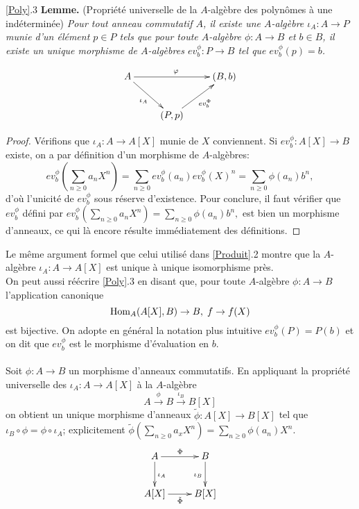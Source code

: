  \ref{Poly}.3 \textbf{Lemme.} (Propriété universelle de la $A$-algèbre des polynômes à une indéterminée) \textit{Pour tout anneau commutatif $A$, il existe une $A$-algèbre $\iota_A: A\rightarrow P$ munie d'un élément $p\in P$ tels que pour toute $A$-algèbre $\phi: A\rightarrow B$ et  $b\in B$, il existe un unique  morphisme de $A$-algèbres $ev^\phi_b:P\rightarrow B$  tel que $ ev^\phi_b(p)=b$. }

	$$ \xymatrix{A \ar[rd]_{\iota_A} \ar[rr]^\varphi && (B, b) \\ & (P, p) \ar[ru]_{ev_b^\Phi}} $$

\begin{proof} Vérifions que $\iota_A:A\rightarrow A[X]$ munie de $X$ conviennent. Si $ev_b^\phi:A[X]\rightarrow B$ existe,  on a par définition d'un morphisme de $A$-algèbres:
$$ev^\phi_b(\sum_{n\geq 0}a_nX^n)=\sum_{n\geq 0}ev_b^\phi(a_n)ev_b^\phi(X)^n=\sum_{n\geq 0}\phi(a_n)b^n,$$
d'où l'unicité de $ev_b^\phi$ sous réserve d'existence.  Pour conclure, il faut vérifier que $ev_b^\phi$ défini par  $ev^\phi_b(\sum_{n\geq 0}a_nX^n)= \sum_{n\geq 0}\phi(a_n)b^n,$ est bien un morphisme d'anneaux, ce qui là encore résulte immédiatement des définitions.
\end{proof}

  Le même argument  formel que celui utilisé dans \ref{Produit}.2 montre que la $A$-algèbre $\iota_A:A\rightarrow A[X]$ est unique à unique isomorphisme  près.\\
 
  On peut aussi réécrire \ref{Poly}.3 en disant que, pour toute $A$-algèbre $\phi:A\rightarrow B$  l'application canonique
$$\hbox{\rm Hom}_A(A[X],B)\rightarrow B,\; f\rightarrow f(X)$$
 est bijective. On adopte  en général la notation plus intuitive $ev_{b}^\phi(P)=P( b)$ et on dit que $ev_{b}^\phi$ est le morphisme d'évaluation en $b$.\\
\\
 Soit $\phi:A  \rightarrow B $ un morphisme  d'anneaux commutatifs. En appliquant la propriété universelle des $\iota_A:A\rightarrow A[X]$  à la $A$-algèbre
$$A\stackrel{\phi}{\rightarrow} B\stackrel{\iota_B}{\rightarrow}B[X]$$
on obtient un unique morphisme d'anneaux  $\tilde{\phi}:A[X]\rightarrow B[X]$ tel que $\iota_B\circ \phi=\phi\circ \iota_A$; explicitement $\tilde{\phi}(\sum_{n\geq 0}a_xX^n)=\sum_{n\geq 0}\phi(a_n)X^n$.\\ 

	$$ \xymatrix{ A\ar[r]^\Phi \ar[d]^{\iota_A} & B \ar[d]_{\iota_B} \\ A[X]\ar[r]_{\tilde{\Phi}} & B[X] } $$
 
